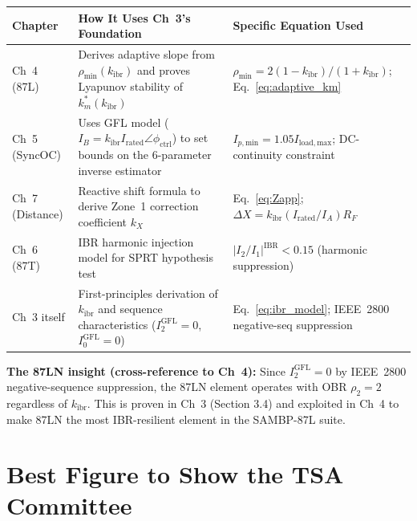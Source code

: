 \documentclass[12pt,a4paper]{article}
\newcommand{\kibr}{k_\mathrm{ibr}}
\newcommand{\Irated}{I_\mathrm{rated}}
\newcommand{\km}{k_m}
\newcommand{\phictrl}{\phi_\mathrm{ctrl}}
\begin{document}
\begin{center}
\small
\begin{tabularx}{\linewidth}{@{}lXX@{}}
\toprule
\textbf{Chapter} & \textbf{How It Uses Ch~3's Foundation} & \textbf{Specific Equation Used} \\
\midrule
Ch~4 (87L) &
  Derives adaptive slope from $\rho_\mathrm{min}(\kibr)$ and proves Lyapunov stability
  of $\km^*(\kibr)$ &
  $\rho_\mathrm{min} = 2(1-\kibr)/(1+\kibr)$; Eq.~\eqref{eq:adaptive_km} \\
Ch~5 (SyncOC) &
  Uses GFL model ($I_B = \kibr\Irated\angle\phictrl$) to set bounds on the
  6-parameter inverse estimator &
  $I_{p,\mathrm{min}} = 1.05 I_\mathrm{load,max}$; DC-continuity constraint \\
Ch~7 (Distance) &
  Reactive shift formula to derive Zone~1 correction coefficient $k_X$ &
  Eq.~\eqref{eq:Zapp}; $\Delta X = \kibr(\Irated/I_A)R_F$ \\
Ch~6 (87T) &
  IBR harmonic injection model for SPRT hypothesis test &
  $|I_2/I_1|^\mathrm{IBR} < 0.15$ (harmonic suppression) \\
Ch~3 itself &
  First-principles derivation of $\kibr$ and sequence characteristics
  ($I_2^\mathrm{GFL} = 0$, $I_0^\mathrm{GFL} = 0$) &
  Eq.~\eqref{eq:ibr_model}; IEEE~2800 negative-seq suppression \\
\bottomrule
\end{tabularx}
\end{center}

\textbf{The 87LN insight (cross-reference to Ch~4):} Since $I_2^\mathrm{GFL} = 0$ by
IEEE~2800 negative-sequence suppression, the 87LN element operates with OBR $\rho_2 = 2$
regardless of $\kibr$.  This is proven in Ch~3 (Section 3.4) and exploited in Ch~4
to make 87LN the most IBR-resilient element in the SAMBP-87L suite.

\section{Best Figure to Show the TSA Committee}
\end{document}
